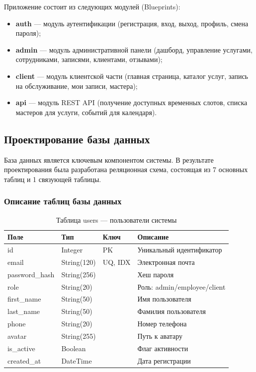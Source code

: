 \documentclass[14pt,a4paper,oneside]{extarticle}
\begin{document}
Приложение состоит из следующих модулей (Blueprints):
\begin{itemize}[leftmargin=2cm]
    \item \textbf{auth} --- модуль аутентификации (регистрация, вход, выход, профиль, смена пароля);
    \item \textbf{admin} --- модуль административной панели (дашборд, управление услугами, сотрудниками, записями, клиентами, отзывами);
    \item \textbf{client} --- модуль клиентской части (главная страница, каталог услуг, запись на обслуживание, мои записи, мастера);
    \item \textbf{api} --- модуль REST API (получение доступных временных слотов, списка мастеров для услуги, событий для календаря).
\end{itemize}

\subsection{Проектирование базы данных}

База данных является ключевым компонентом системы. В результате проектирования была разработана реляционная схема, состоящая из 7 основных таблиц и 1 связующей таблицы.

\subsubsection{Описание таблиц базы данных}

\begin{table}[H]
\caption{Таблица users --- пользователи системы}\label{tab:users}
\centering
\begin{tabularx}{\textwidth}{|l|l|l|X|}
\hline
\textbf{Поле} & \textbf{Тип} & \textbf{Ключ} & \textbf{Описание} \\
\hline
id & Integer & PK & Уникальный идентификатор \\
\hline
email & String(120) & UQ, IDX & Электронная почта \\
\hline
password\_hash & String(256) & & Хеш пароля \\
\hline
role & String(20) & & Роль: admin/employee/client \\
\hline
first\_name & String(50) & & Имя пользователя \\
\hline
last\_name & String(50) & & Фамилия пользователя \\
\hline
phone & String(20) & & Номер телефона \\
\hline
avatar & String(255) & & Путь к аватару \\
\hline
is\_active & Boolean & & Флаг активности \\
\hline
created\_at & DateTime & & Дата регистрации \\
\hline
\end{tabularx}
\end{table}
\end{document}
